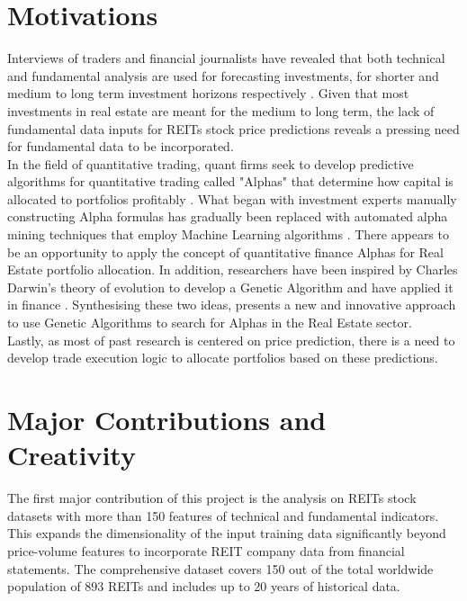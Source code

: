 \documentclass[a4paper,12pt]{report}
\numberwithin{equation}{section}
\theoremstyle{definition}
\begin{document}
\section{Motivations}
Interviews of traders and financial journalists have revealed that both technical and fundamental analysis are used for forecasting investments, for shorter and medium to long term investment horizons respectively \cite{oberlechner_importance_2001}. Given that most investments in real estate are meant for the medium to long term, the lack of fundamental data inputs for REITs stock price predictions reveals a pressing need for fundamental data to be incorporated. \\ 

In the field of quantitative trading, quant firms seek to develop predictive algorithms for quantitative trading called "Alphas" that determine how capital is allocated to portfolios profitably \cite{tulchinsky_finding_2019}. What began with investment experts manually constructing Alpha formulas has gradually been replaced with automated alpha mining techniques that employ Machine Learning algorithms \cite{wang_alpha-gpt_2023}. There appears to be an opportunity to apply the concept of quantitative finance Alphas for Real Estate portfolio allocation. In addition, researchers have been inspired by Charles Darwin's theory of evolution \cite{ruse_charles_1975} to develop a Genetic Algorithm and have applied it in finance \cite{aguilar-rivera_genetic_2015}. Synthesising these two ideas, presents a new and innovative approach to use Genetic Algorithms to search for Alphas in the Real Estate sector. \\

Lastly, as most of past research is centered on price prediction, there is a need to develop trade execution logic to allocate portfolios based on these predictions.



\section{Major Contributions and Creativity}
The first major contribution of this project is the analysis on REITs stock datasets with more than 150 features of technical and fundamental indicators. This expands the dimensionality of the input training data significantly beyond price-volume features to incorporate REIT company data from financial statements. The comprehensive dataset covers 150 out of the total worldwide population of 893 REITs and includes up to 20 years of historical data.\\
\end{document}
